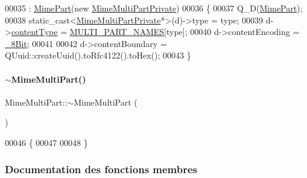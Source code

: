 \begin{DoxyCode}
00035                                                : \hyperlink{class_simple_mail_1_1_mime_part_a32106b6567131dd5f4e8d26359a85249}{MimePart}(\textcolor{keyword}{new} 
      \hyperlink{class_simple_mail_1_1_mime_multi_part_private}{MimeMultiPartPrivate})
00036 \{
00037     Q\_D(\hyperlink{class_simple_mail_1_1_mime_part}{MimePart});
00038     \textcolor{keyword}{static\_cast<}\hyperlink{class_simple_mail_1_1_mime_multi_part_private}{MimeMultiPartPrivate}*\textcolor{keyword}{>}(d)->type = type;
00039     d->\hyperlink{class_simple_mail_1_1_mime_part_private_afa20c6a7b4de31598affbc3e8fae207a}{contentType} = \hyperlink{mimemultipart_8cpp_aa142910ed0cce7101d8d240227ae592d}{MULTI\_PART\_NAMES}[type];
00040     d->contentEncoding = \hyperlink{class_simple_mail_1_1_mime_part_ae67a2f5406958b95b18bf31a7bbeb5c9a27c1574a6fe2fa936ae6cfe9654bb37f}{\_8Bit};
00041 
00042     d->contentBoundary = QUuid::createUuid().toRfc4122().toHex();
00043 \}
\end{DoxyCode}
\mbox{\label{class_simple_mail_1_1_mime_multi_part_a460bb28faff5859d22cacd49defb3284}} 
\paragraph{\texorpdfstring{$\sim$\+Mime\+Multi\+Part()}{~MimeMultiPart()}}
{\footnotesize\ttfamily Mime\+Multi\+Part\+::$\sim$\+Mime\+Multi\+Part (\begin{DoxyParamCaption}{ }\end{DoxyParamCaption})\hspace{0.3cm}{\ttfamily [virtual]}}


\begin{DoxyCode}
00046 \{
00047 
00048 \}
\end{DoxyCode}


\subsubsection{Documentation des fonctions membres}
\mbox{\label{class_simple_mail_1_1_mime_multi_part_a11b7d5bc0ac8610d113f781fb6f8b52b}} 
